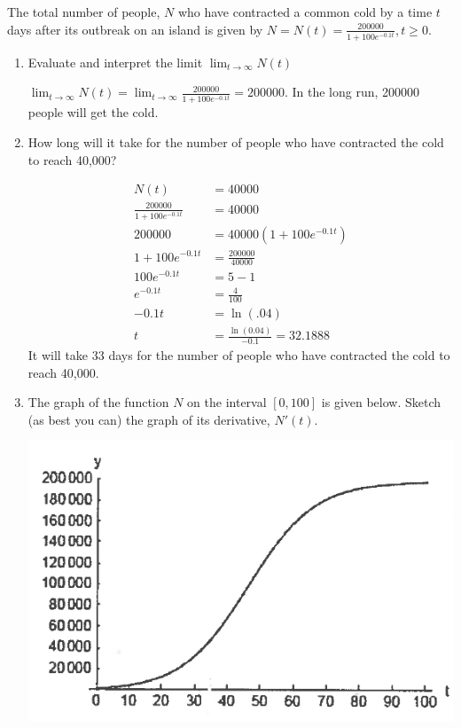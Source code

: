 \documentclass[nooutcomes]{ximera}
\begin{document}
\begin{problem}
The total number of people, $N$ who have contracted a common cold by a time $t$ days after its outbreak on an island is given by $N=N(t)= \frac{200000}{1+100e^{-0.1t}},t\geq0$.

	\begin{enumerate}
		\item Evaluate and interpret the limit $\lim_{t \to \infty} N(t)$
			\begin{freeResponse}	
			$\lim_{t \to \infty} N(t)=\lim_{t \to \infty} \frac{200000}{1+100e^{-0.1t}}=200000$.  In the long run, 200000 people will get the cold.
			\end{freeResponse}
		\item How long will it take for the number of people who have contracted the cold to reach 40,000?
			\begin{freeResponse}
				\begin{align*}
				N(t)&=40000\\
				\frac{200000}{1+100e^{-0.1t}}&=40000\\
				200000&=40000(1+100e^{-0.1t})\\
				1+100e^{-0.1t}&=\frac{200000}{40000}\\
				100e^{-0.1t}&=5-1\\
				e^{-0.1t}&=\frac{4}{100}\\
				-0.1t&=\ln(.04)\\
				t&=\frac{\ln(0.04)}{-0.1}=32.1888
				\end{align*}
			It will take 33 days for the number of people who have contracted the cold to reach 40,000.
			\end{freeResponse}
		\item The graph of the function $N$ on the interval $[0,100]$ is given below.  Sketch (as best you can) the graph of its derivative, $N'(t)$.
			\begin{image}
			\includegraphics[scale=.4]{Figure8.png}

\end{image}
\end{enumerate}
\end{problem}
\end{document}
